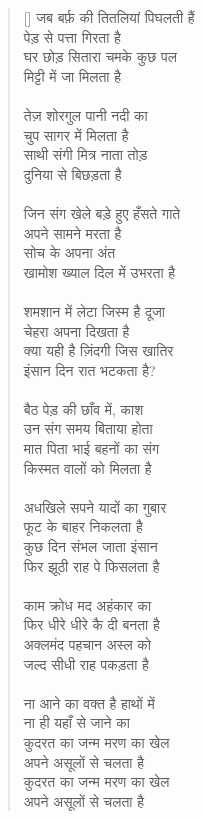 \begin{verse}[\versewidth]\texthindi{
जब बर्फ़ की तितलियां पिघलती हैं\\
पेड़ से पत्ता गिरता है\\
घर छोड़ सितारा चमके कुछ पल\\
मिट्टी में जा मिलता है\\
\\
तेज़ शोरगुल पानी नदी का\\
चुप सागर में मिलता है\\
साथी संगी मित्र नाता तोड़\\
दुनिया से बिछड़ता है\\
\\
जिन संग खेले बड़े हुए हँसते गाते\\
अपने सामने मरता है\\
सोच के अपना अंत\\
खामोश ख्याल दिल में उभरता है\\
\\
शमशान में लेटा जिस्म है दूजा\\
चेहरा अपना दिखता है\\
क्या यही है ज़िंदगी जिस खातिर\\
इंसान दिन रात भटकता है?\\
\\
बैठ पेड़ की छाँव में, काश\\
उन संग समय बिताया होता\\
मात पिता भाई बहनों का संग\\
किस्मत वालों को मिलता है\\
\\
अधखिले सपने यादों का गुबार\\
फूट के बाहर निकलता है\\
कुछ दिन संभल जाता इंसान\\
फिर झूठी राह पे फिसलता है\\
\\
काम क्रोध मद अहंकार का\\
फिर धीरे धीरे कै दी बनता है\\
अक्लमंद पहचान अस्ल को\\
जल्द सीधी राह पकड़ता है\\
\\
ना आने का वक्त है हाथों में\\
ना ही यहाँ से जाने का\\
कुदरत का जन्म मरण का खेल\\
अपने असूलों से चलता है\\
कुदरत का जन्म मरण का खेल\\
अपने असूलों से चलता है
}\end{verse}

